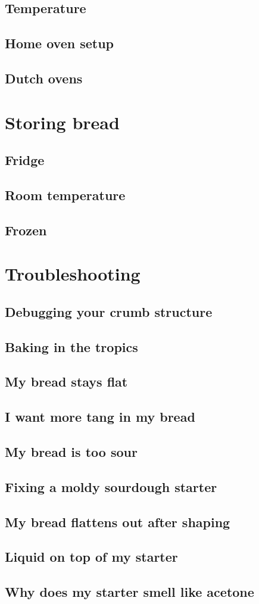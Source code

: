 \documentclass[a4paper, 12pt]{book}
\begin{document}
\section{Temperature}
\section{Home oven setup}
\section{Dutch ovens}

\chapter{Storing bread}
\section{Fridge}
\section{Room temperature}
\section{Frozen}

\chapter{Troubleshooting}

\section{Debugging your crumb structure}

\section{Baking in the tropics}
\section{My bread stays flat}
\section{I want more tang in my bread}
\section{My bread is too sour}
\section{Fixing a moldy sourdough starter}
\section{My bread flattens out after shaping}
\section{Liquid on top of my starter}
\section{Why does my starter smell like acetone}

\printbibliography
\end{document}
